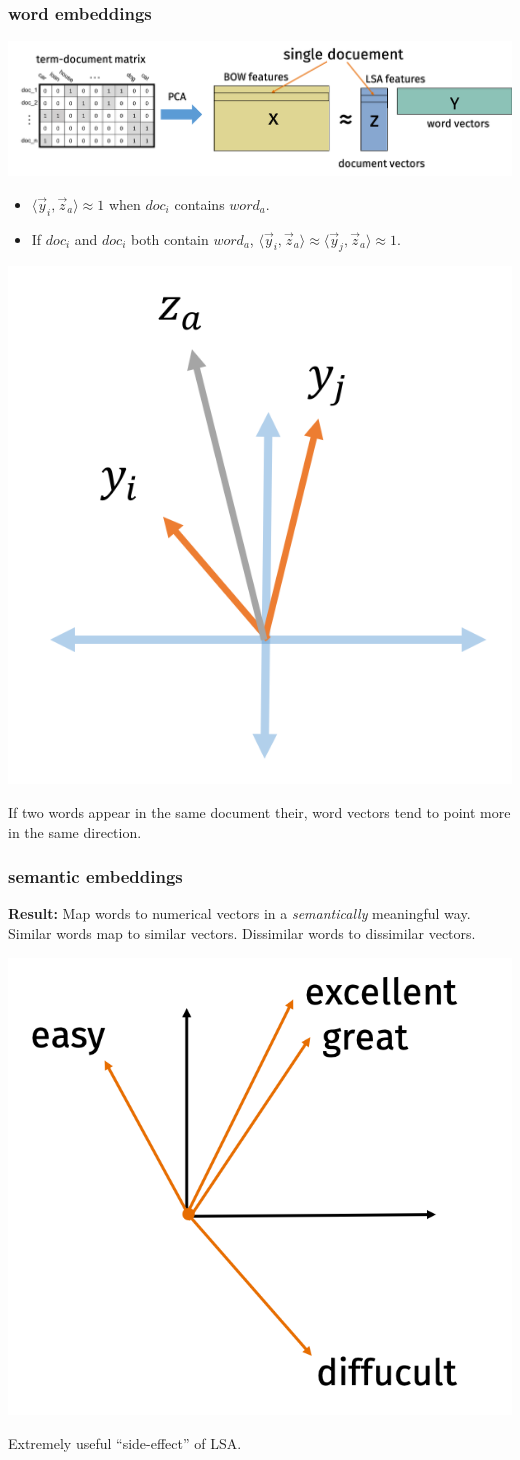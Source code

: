 \documentclass[handout,compress]{beamer}
\begin{document}
\begin{frame}
	\frametitle{word embeddings}
	\begin{center}
		\includegraphics[width=.8\textwidth]{mylsa.png}
	\end{center}
	\begin{itemize}
		\item $\langle \vec y_i, \vec z_a \rangle \approx 1$ when $doc_i$ contains $word_a$. 
		\item If $doc_i$ and $doc_i$ both contain $word_a$, $\langle \vec y_i, \vec z_a \rangle \approx \langle \vec y_j, \vec z_a \rangle \approx 1$.
	\end{itemize}
	\vspace{-2em}
	\begin{center}
		\includegraphics[width=.25\textwidth]{lsa2.png}
		
	If two words appear in the same document their, word vectors tend to point more in the same direction. 
	\end{center}
\end{frame}

\begin{frame}
	\frametitle{semantic embeddings}
	\textbf{Result:} Map words to numerical vectors in a \emph{semantically} meaningful way. Similar words map to similar vectors. Dissimilar words to dissimilar vectors.
	
	\begin{center}
		\includegraphics[width=.4\textwidth]{semantic_embedding.png}
		
		Extremely useful ``side-effect'' of LSA.
	\end{center}
\end{frame}
\end{document}
